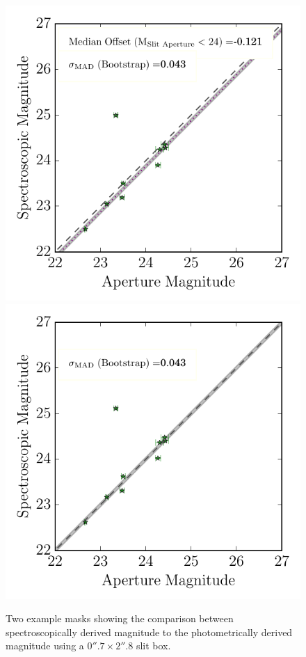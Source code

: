 \documentclass[iop]{emulateapj}
\begin{document}
\begin{figure}
\includegraphics[scale=0.9]{figures/magcomp_H1_bs_comp.pdf}
\includegraphics[scale=0.9]{figures/magcomp_H1_as_comp.pdf}
\caption{Two example masks showing the comparison between spectroscopically derived magnitude to the photometrically derived magnitude using a $0''.7 \times 2''.8$ slit box. 
}
\end{figure}
\end{document}
